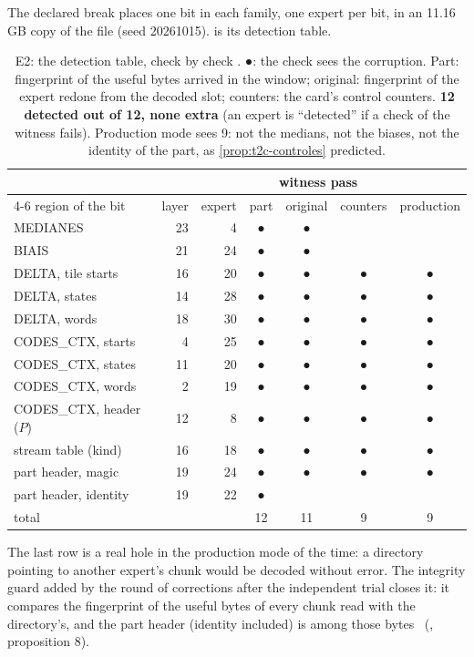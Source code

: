 The declared break places one bit in each family, one expert per bit, in an 11.16\,GB copy of the file (seed 20261015).  is its detection table.

\begin{table}[ht]
\centering\small
\caption[E2: the detection table of the break]{E2: the detection table, check by check \mes. ●: the check sees the corruption. Part: fingerprint of the useful bytes arrived in the window; original: fingerprint of the expert redone from the decoded slot; counters: the card's control counters. \textbf{12 detected out of 12, none extra} (an expert is ``detected'' if a check of the witness fails). Production mode sees 9: not the medians, not the biases, not the identity of the part, as \cref{prop:t2c-controles} predicted.}
\label{tab:t2c-cassure}
\begin{tabular}{@{}lrrcccc@{}}
\toprule
 & & & \multicolumn{3}{c}{witness pass} & \\
\cmidrule(lr){4-6}
region of the bit & layer & expert & part & original & counters & production \\
\midrule
MEDIANES & 23 & 4 & ● & ● & & \\
BIAIS & 21 & 24 & ● & ● & & \\
DELTA, tile starts & 16 & 20 & ● & ● & ● & ● \\
DELTA, states & 14 & 28 & ● & ● & ● & ● \\
DELTA, words & 18 & 30 & ● & ● & ● & ● \\
CODES\_CTX, starts & 4 & 25 & ● & ● & ● & ● \\
CODES\_CTX, states & 11 & 20 & ● & ● & ● & ● \\
CODES\_CTX, words & 2 & 19 & ● & ● & ● & ● \\
CODES\_CTX, header ($P$) & 12 & 8 & ● & ● & ● & ● \\
stream table (kind) & 16 & 18 & ● & ● & ● & ● \\
part header, magic & 19 & 24 & ● & ● & ● & ● \\
part header, identity & 19 & 22 & ● & & & \\
\midrule
total & & & 12 & 11 & 9 & 9 \\
\bottomrule
\end{tabular}
\end{table}

The last row is a real hole in the production mode of the time: a directory pointing to another expert's chunk would be decoded without error. The integrity guard added by the round of corrections after the independent trial closes it: it compares the fingerprint of the useful bytes of every chunk read with the directory's, and the part header (identity included) is among those bytes \calc~(, proposition 8).

